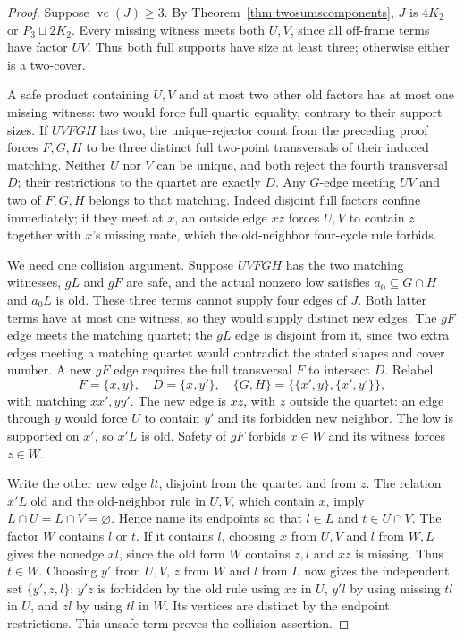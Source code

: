 \documentclass[11pt]{article}
\newcommand{\vc}{\operatorname{vc}}
\theoremstyle{definition}
\theoremstyle{remark}
\begin{document}
\begin{proof}
Suppose $\vc(J)\ge3$. By Theorem~\ref{thm:twosumscomponents}, $J$ is $4K_2$ or $P_3\sqcup2K_2$. Every missing witness meets both $U,V$, since all off-frame terms have factor $UV$. Thus both full supports have size at least three; otherwise either is a two-cover.

A safe product containing $U,V$ and at most two other old factors has at most one missing witness: two would force full quartic equality, contrary to their support sizes. If $UVFGH$ has two, the unique-rejector count from the preceding proof forces $F,G,H$ to be three distinct full two-point transversals of their induced matching. Neither $U$ nor $V$ can be unique, and both reject the fourth transversal $D$; their restrictions to the quartet are exactly $D$. Any $G$-edge meeting $UV$ and two of $F,G,H$ belongs to that matching. Indeed disjoint full factors confine immediately; if they meet at $x$, an outside edge $xz$ forces $U,V$ to contain $z$ together with $x$'s missing mate, which the old-neighbor four-cycle rule forbids.

We need one collision argument. Suppose $UVFGH$ has the two matching witnesses, $gL$ and $gF$ are safe, and the actual nonzero low satisfies $a_0\subseteq G\cap H$ and $a_0L$ is old. These three terms cannot supply four edges of $J$. Both latter terms have at most one witness, so they would supply distinct new edges. The $gF$ edge meets the matching quartet; the $gL$ edge is disjoint from it, since two extra edges meeting a matching quartet would contradict the stated shapes and cover number. A new $gF$ edge requires the full transversal $F$ to intersect $D$. Relabel
\[
 F=\{x,y\},\quad D=\{x,y'\},\quad
 \{G,H\}=\{\{x',y\},\{x',y'\}\},
\]
with matching $xx',yy'$. The new edge is $xz$, with $z$ outside the quartet: an edge through $y$ would force $U$ to contain $y'$ and its forbidden new neighbor. The low is supported on $x'$, so $x'L$ is old. Safety of $gF$ forbids $x\in W$ and its witness forces $z\in W$.

Write the other new edge $lt$, disjoint from the quartet and from $z$. The relation $x'L$ old and the old-neighbor rule in $U,V$, which contain $x$, imply $L\cap U=L\cap V=\varnothing$. Hence name its endpoints so that $l\in L$ and $t\in U\cap V$. The factor $W$ contains $l$ or $t$. If it contains $l$, choosing $x$ from $U,V$ and $l$ from $W,L$ gives the nonedge $xl$, since the old form $W$ contains $z,l$ and $xz$ is missing. Thus $t\in W$. Choosing $y'$ from $U,V$, $z$ from $W$ and $l$ from $L$ now gives the independent set $\{y',z,l\}$: $y'z$ is forbidden by the old rule using $xz$ in $U$, $y'l$ by using missing $tl$ in $U$, and $zl$ by using $tl$ in $W$. Its vertices are distinct by the endpoint restrictions. This unsafe term proves the collision assertion.


\end{proof}
\end{document}
